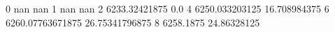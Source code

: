 0 nan nan
1 nan nan
2 6233.32421875 0.0
4 6250.033203125 16.708984375
6 6260.07763671875 26.75341796875
8 6258.1875 24.86328125
